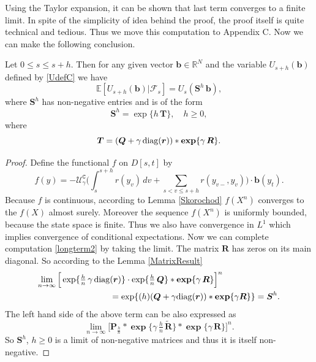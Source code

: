 Using the Taylor expansion, it can be shown that last term converges to a finite limit. In spite of the simplicity of idea behind the proof, the proof itself is quite technical and tedious. Thus we move this computation to Appendix C. Now we can make the following conclusion.
\begin{prop}
\label{propC}
Let $0\leq s\leq s+h$. Then for any given vector $\bm{b}\in\mathbb{R}^N$ and the variable $U_{s+h}(\bm{b})$ defined by \eqref{UdefC} we have
$$\mathbb{E}[U_{s+h}(\bm{b})|\mathcal{F}_{s}]=U_{s}(\bm{S}^{h}\,\bm{b}),$$
where $\bm{S}^h$ has non-negative entries and is of the form
\begin{equation}
\label{SdefC}
\bm{S}^h=\exp\{h\,\bm{T}\}, \quad h\geq 0,
\end{equation}
where
\begin{equation}
\label{TdefC}
\mbox{\boldmath{$T$}}=(\mbox{\boldmath{$Q$}}+\gamma\,\mathrm{diag}(\mbox{\boldmath{$r$}}))\ast\mbox{\boldmath{$\exp$}}\{\gamma\,\mbox{\boldmath{$R$}}\}.
\end{equation}
\end{prop}
\begin{proof}
Define the functional $f$ on $D[s,t]$ by %
\[f(y)=-\mathcal{U}_{\gamma}^{\texttt{C}}\Big(\int_s^{s+h} r(y_v)\,dv + \sum_{s< v\leq s+h} r(y_{v-},y_{v})\Big)\cdot \bm{b}(y_t).\]
Because $f$ is continuous, according to Lemma \ref{Skorochod} $f(X^n)$ converges to the $f(X)$ almost surely. Moreover the sequence $f(X^n)$ is uniformly bounded, because the state space is finite. Thus we also have convergence in $L^1$ which implies convergence of conditional expectations. Now we can complete computation \eqref{longterm2} by taking the limit. The matrix $\bm{R}$ has zeros on its main diagonal. So according to the Lemma \ref{MatrixResult}
\begin{equation*}
\begin{split}
\lim_{n\rightarrow\infty}\Big[\exp\{\tfrac{h}{n}\,\gamma\,\mathrm{diag}&(\mbox{\boldmath{$r$}})\}\cdot \exp\{\tfrac{h}{n}\,\mbox{\boldmath{$Q$}}\} \ast\mbox{\boldmath{$\exp$}}\{\gamma\,\mbox{\boldmath{$R$}}\}\Big]^n\\
&=\exp\{(h)(\mbox{\boldmath{$Q$}}+\gamma\mathrm{diag}(\mbox{\boldmath{$r$}}))\ast\mbox{\boldmath{$\exp$}}\{\gamma\mbox{\boldmath{$R$}}\}\}=\mbox{\boldmath{$S$}}^{h}.\\
\end{split}
\end{equation*}
The left hand side of the above term can be also expressed as %
$$\lim_{n\rightarrow\infty}\Big[\bm{P}_{\frac{h}{n}}\ast\bm{\exp}\{\gamma\,\tfrac{h}{n}\,\bm{\widetilde{R}}\} \ast\bm{\exp}\{\gamma\,\bm{R}\}\Big]^n.$$
So $\bm{S}^h$, $h\geq0$ is a limit of non-negative matrices and thus it is itself non-negative.
\end{proof}

